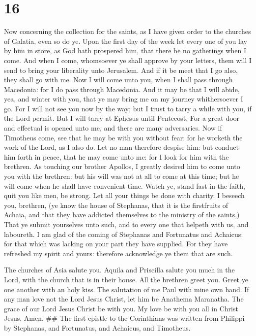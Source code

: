 \hypertarget{section-15}{%
\section{16}\label{section-15}}

 Now concerning the collection for the saints, as I have
given order to the churches of Galatia, even so do ye. 
Upon the first day of the week let every one of you lay by him in store,
as God hath prospered him, that there be no gatherings when I come.
 And when I come, whomsoever ye shall approve by your
letters, them will I send to bring your liberality unto Jerusalem.
 And if it be meet that I go also, they shall go with me.
 Now I will come unto you, when I shall pass through
Macedonia: for I do pass through Macedonia.  And it may be
that I will abide, yea, and winter with you, that ye may bring me on my
journey whithersoever I go.  For I will not see you now by
the way; but I trust to tarry a while with you, if the Lord permit.
 But I will tarry at Ephesus until Pentecost.
 For a great door and effectual is opened unto me, and
there are many adversaries.  Now if Timotheus come, see
that he may be with you without fear: for he worketh the work of the
Lord, as I also do.  Let no man therefore despise him:
but conduct him forth in peace, that he may come unto me: for I look for
him with the brethren.  As touching our brother Apollos,
I greatly desired him to come unto you with the brethren: but his will
was not at all to come at this time; but he will come when he shall have
convenient time.  Watch ye, stand fast in the faith, quit
you like men, be strong.  Let all your things be done
with charity.  I beseech you, brethren, (ye know the
house of Stephanas, that it is the firstfruits of Achaia, and that they
have addicted themselves to the ministry of the saints,) 
That ye submit yourselves unto such, and to every one that helpeth with
us, and laboureth.  I am glad of the coming of Stephanas
and Fortunatus and Achaicus: for that which was lacking on your part
they have supplied.  For they have refreshed my spirit
and yours: therefore acknowledge ye them that are such.

 The churches of Asia salute you. Aquila and Priscilla
salute you much in the Lord, with the church that is in their house.
 All the brethren greet you. Greet ye one another with an
holy kiss.  The salutation of me Paul with mine own hand.
 If any man love not the Lord Jesus Christ, let him be
Anathema Maranatha.  The grace of our Lord Jesus Christ
be with you.  My love be with you all in Christ Jesus.
Amen. \#\# The first epistle to the Corinthians was written from
Philippi by Stephanas, and Fortunatus, and Achaicus, and Timotheus.
